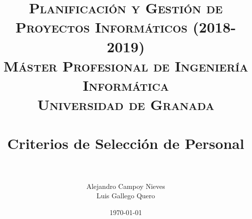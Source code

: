 

\title{	
	\normalfont \normalsize 
	\textsc{\textbf{Planificación y Gestión de Proyectos Informáticos (2018-2019)} \\ Máster Profesional de Ingeniería Informática \\ Universidad de Granada} \\ [25pt] %
	\horrule{0.5pt} \\[0.4cm] %
	\huge Criterios de Selección de Personal \\ %
	\horrule{2pt} \\[0.5cm] %
}

\author{Alejandro Campoy Nieves \\ Luis Gallego Quero} %
\date{\normalsize\today} %

\usepackage[spanish, es-tabla]{babel}
\usepackage{hyperref} %
\hypersetup{
	colorlinks=true,
	linkcolor=blue,
	filecolor=magenta,      
	urlcolor=blue,
}
\usepackage{graphicx}
\usepackage{amssymb, amsmath, amsbsy}
\usepackage{mathptmx}	
\usepackage{float}
\usepackage{booktabs}					%
\usepackage{eurosym}

\usepackage[table]{xcolor}
\usepackage{color}
\usepackage{colortbl}
\usepackage{multicol}
\usepackage{multirow}
\usepackage{booktabs}
\usepackage{tabularx}
\usepackage{array}
\usepackage{caption}
\usepackage{subcaption}




	\maketitle %
	
	\newpage %
	
	\tableofcontents %
	
	
